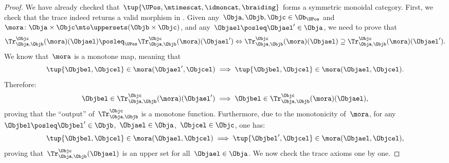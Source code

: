 \begin{proof}
    We have already checked that~$\tup{\UPos,\mtimescat, \idmoncat,\braiding}$ forms a symmetric monoidal category.
    First, we check that the trace indeed returns a valid morphism in \UPos.
    Given any~$\Obja,\Objb,\Objc\in \Ob_\UPos$ and~$\mora\colon \Obja\times \Objc \mto \uppersets(\Objb\times \Objc)$,
    and any~$\Objael\posleq \Objael'\in \Obja$, we need to prove that
    \begin{equation*}
        \Tr_{\Obja,\Objb}^{\Objc}(\mora)(\Objael) \posleq_\UPos  \Tr_{\Obja,\Objb}^{\Objc}(\mora)(\Objael') \Leftrightarrow \Tr_{\Obja,\Objb}^{\Objc}(\mora)(\Objael) \supseteq \Tr_{\Obja,\Objb}^{\Objc}(\mora)(\Objael').
    \end{equation*}
    We know that~$\mora$ is a monotone map, meaning that
    \begin{equation*}
        \tup{\Objbel,\Objcel} \in \mora(\Objael',\Objcel) \implies \tup{\Objbel,\Objcel}\in \mora(\Objael,\Objcel).
    \end{equation*}
    Therefore:
    \begin{equation*}
        \Objbel \in \Tr_{\Obja,\Objb}^{\Objc}(\mora)(\Objael') \implies \Objbel \in \Tr_{\Obja,\Objb}^{\Objc}(\mora)(\Objael),
    \end{equation*}
    proving that the ``output'' of~$\Tr_{\Obja,\Objb}^{\Objc}$ is a monotone function.
    Furthermore, due to the monotonicity of~$\mora$, for any~$\Objbel\posleq \Objbel'\in \Objb$,~$\Objael\in \Obja$,~$\Objcel \in \Objc$, one has:
    \begin{equation*}
        \tup{\Objbel,\Objcel}\in \mora(\Objael,\Objcel)\implies \tup{\Objbel',\Objcel}\in \mora(\Objael,\Objcel),
    \end{equation*}
    proving that~$\Tr_{\Obja,\Objb}^{\Objc}(\Objael)$ is an upper set for all~$\Objael\in \Obja$.
    We now check the trace axioms one by one.


\end{proof}
